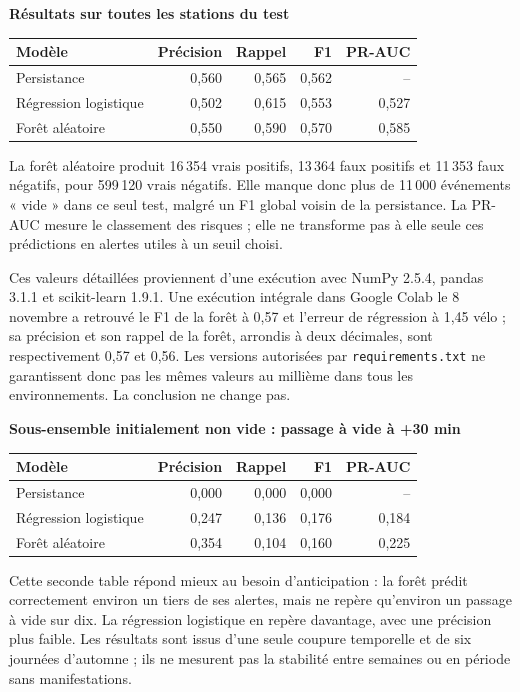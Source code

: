 \documentclass[11pt,a4paper]{article}
\begin{document}
\begin{center}
\textbf{Résultats sur toutes les stations du test}\par\smallskip
\begin{tabular}{@{}lrrrr@{}}
\toprule
Modèle & Précision & Rappel & F1 & PR-AUC\\
\midrule
Persistance & 0,560 & 0,565 & 0,562 & --\\
Régression logistique & 0,502 & 0,615 & 0,553 & 0,527\\
Forêt aléatoire & 0,550 & 0,590 & 0,570 & 0,585\\
\bottomrule
\end{tabular}
\end{center}

La forêt aléatoire produit 16\,354 vrais positifs, 13\,364 faux positifs et 11\,353 faux négatifs, pour 599\,120 vrais négatifs. Elle manque donc plus de 11\,000 événements « vide » dans ce seul test, malgré un F1 global voisin de la persistance. La PR-AUC mesure le classement des risques ; elle ne transforme pas à elle seule ces prédictions en alertes utiles à un seuil choisi.

Ces valeurs détaillées proviennent d'une exécution avec NumPy 2.5.4, pandas 3.1.1 et scikit-learn 1.9.1. Une exécution intégrale dans Google Colab le 8 novembre a retrouvé le F1 de la forêt à 0,57 et l'erreur de régression à 1,45 vélo ; sa précision et son rappel de la forêt, arrondis à deux décimales, sont respectivement 0,57 et 0,56. Les versions autorisées par \texttt{requirements.txt} ne garantissent donc pas les mêmes valeurs au millième dans tous les environnements. La conclusion ne change pas.

\begin{center}
\textbf{Sous-ensemble initialement non vide : passage à vide à +30 min}\par\smallskip
\begin{tabular}{@{}lrrrr@{}}
\toprule
Modèle & Précision & Rappel & F1 & PR-AUC\\
\midrule
Persistance & 0,000 & 0,000 & 0,000 & --\\
Régression logistique & 0,247 & 0,136 & 0,176 & 0,184\\
Forêt aléatoire & 0,354 & 0,104 & 0,160 & 0,225\\
\bottomrule
\end{tabular}
\end{center}

Cette seconde table répond mieux au besoin d'anticipation : la forêt prédit correctement environ un tiers de ses alertes, mais ne repère qu'environ un passage à vide sur dix. La régression logistique en repère davantage, avec une précision plus faible. Les résultats sont issus d'une seule coupure temporelle et de six journées d'automne ; ils ne mesurent pas la stabilité entre semaines ou en période sans manifestations.
\end{document}
